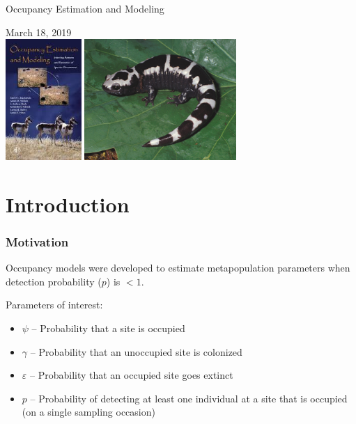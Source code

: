 \documentclass[color=usenames,dvipsnames]{beamer}\usepackage[]{graphicx}\usepackage[]{color}
\begin{document}
\begin{frame}[plain]
  \begin{center}
    {\huge Occupancy Estimation and Modeling \par}
    \vspace{0.5cm}
    { \Large March 18, 2019} \\
    \vfill
    \includegraphics[height=4.6cm,keepaspectratio]{figs/book} %
    \hspace{0.5cm}
      \includegraphics[height=4.6cm,keepaspectratio,trim = 0mm
        0mm 0mm 0mm, clip]{figs/marbled_salamander.jpg}
  \end{center}
\end{frame}



\section{Introduction}


\begin{frame}
  \frametitle{Motivation}
  {\centering \Large Occupancy models were developed to estimate metapopulation
    parameters when \alert{detection probability} ($p$) is $<1$. \par}
  \pause
  \vspace{0.5cm}
  \large
  Parameters of interest:
  \begin{itemize}[<+->]
    \item $\psi$ -- Probability that a site is occupied
    \item $\gamma$ -- Probability that an unoccupied site is colonized
    \item $\varepsilon$ -- Probability that an occupied site goes extinct
    \item $p$ -- Probability of detecting at least one individual at a
      site that is occupied (on a single sampling occasion)
  \end{itemize}
\end{frame}
\end{document}
